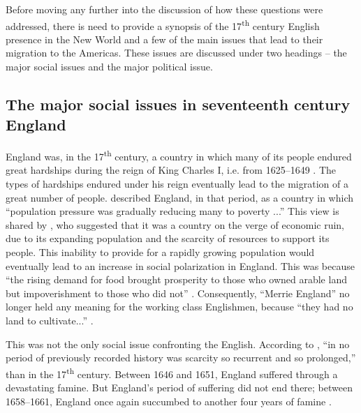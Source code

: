 Before moving any further into the discussion of how these questions were addressed, there is need to provide a synopsis of the 17\textsuperscript{th} century English presence in the New World and a few of the main issues that lead to their migration to the Americas. These issues are discussed under two headings -- the major social issues and the major political issue.

\subsection{The major social issues in seventeenth century England}\label{6.1.1}
England was, in the 17\textsuperscript{th} century, a country in which many of its people endured great hardships during the reign of King Charles I, i.e. from 1625--1649 \citep[25]{Parker11}. The types of hardships endured under his reign eventually lead to the migration of a great number of people. \citet[145]{Fisher90} described England, in that period, as a country in which ``population pressure was gradually reducing many to poverty ...'' This view is shared by \citet[37]{Beckles89}, who suggested that it was a country on the verge of economic ruin, due to its expanding population and the scarcity of resources to support its people. This inability to provide for a rapidly growing population would eventually lead to an increase in social polarization in England. This was because ``the rising demand for food brought prosperity to those who owned arable land but impoverishment to those who did not'' \citep[3]{Amussen09}. Consequently, ``Merrie England'' no longer held any meaning for the working class Englishmen, because ``they had no land to cultivate...'' \citep[394]{Bridenbaugh68}.

This was not the only social issue confronting the English. According to \citet[57]{Rogers89}, ``in no period of previously recorded history was scarcity so recurrent and so prolonged,'' than in the 17\textsuperscript{th} century. Between 1646 and 1651, England suffered through a devastating famine. But England's period of suffering did not end there; between 1658--1661, England once again succumbed to another four years of famine \citep[57]{Rogers89}.

